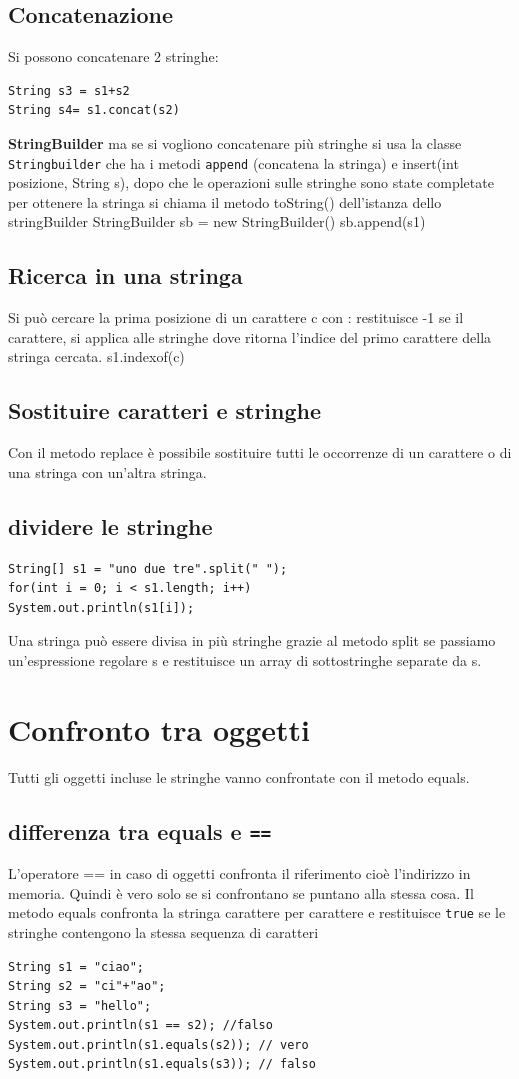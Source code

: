 \documentclass[11pt]{article}
\begin{document}
\subsection{Concatenazione}
\label{sec:org8d6ce72}
Si possono concatenare 2 stringhe:
\begin{verbatim}
String s3 = s1+s2
String s4= s1.concat(s2)
\end{verbatim}

\textbf{StringBuilder}
ma se si vogliono concatenare più stringhe si usa la classe \texttt{Stringbuilder} che ha i metodi \texttt{append} (concatena la stringa) e insert(int posizione, String s), dopo che le operazioni sulle stringhe sono state completate per ottenere la stringa si chiama il metodo toString() dell'istanza dello stringBuilder
StringBuilder sb = new StringBuilder()
sb.append(s1)
\subsection{Ricerca in una stringa}
\label{sec:org4962f03}
Si può cercare la prima posizione di un carattere c con : restituisce -1 se il carattere, si applica alle stringhe dove ritorna l'indice del primo carattere della stringa cercata.
s1.indexof(c)
\subsection{Sostituire caratteri e stringhe}
\label{sec:org17dfc68}
Con il metodo replace è possibile sostituire tutti le occorrenze di un carattere o di una stringa con un'altra stringa.
\subsection{dividere le stringhe}
\label{sec:org3acd848}
\begin{verbatim}
String[] s1 = "uno due tre".split(" ");
for(int i = 0; i < s1.length; i++)
System.out.println(s1[i]);
\end{verbatim}

Una stringa può essere divisa in più stringhe grazie al metodo split se passiamo un'espressione regolare s e restituisce un array di sottostringhe separate da s.
\section{Confronto tra oggetti}
\label{sec:orgf7120fd}
Tutti gli oggetti incluse le stringhe vanno confrontate con il metodo equals.
\subsection{differenza tra equals e \texttt{==}}
\label{sec:org3d03a74}
L'operatore == in caso di oggetti confronta il riferimento cioè l'indirizzo in memoria. Quindi è vero solo se si confrontano se puntano alla stessa cosa.
Il metodo equals confronta la stringa carattere per carattere e restituisce \texttt{true} se le stringhe contengono la stessa sequenza di caratteri
\begin{verbatim}
String s1 = "ciao";
String s2 = "ci"+"ao";
String s3 = "hello";
System.out.println(s1 == s2); //falso
System.out.println(s1.equals(s2)); // vero
System.out.println(s1.equals(s3)); // falso
\end{verbatim}
\end{document}
